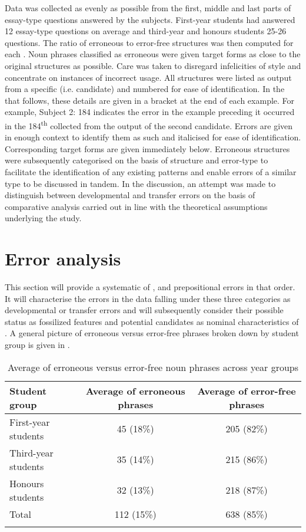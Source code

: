 \documentclass[output=paper]{langsci/langscibook}
\begin{document}
Data was collected as evenly as possible from the first, middle and
last parts of essay-type questions answered by the
subjects. First-year students had answered 12 essay-type questions on
average and third-year and honours students 25-26 questions. The ratio
of erroneous to error-free structures was then computed for each
. Noun phrases classified as erroneous were given target forms
as close to the original structures as possible. Care was taken to
disregard infelicities of style and concentrate on instances of
incorrect usage. All structures were listed as output from a specific
 (i.e. candidate) and numbered for ease of identification. In
the  that follows, these details are given in a bracket
at the end of each example. For example, Subject 2: 184
indicates the error in the example preceding it occurred in the
184\textsuperscript{th}   collected from the output of the
second candidate. Errors are given in enough context to identify them
as such and italicised for ease of identification. Corresponding
target forms are given immediately below. Erroneous structures were
subsequently categorised on the basis of structure and error-type to
facilitate the identification of any existing patterns and enable
errors of a similar type to be discussed in tandem. In the discussion,
an attempt was made to distinguish between developmental and transfer
errors on the basis of comparative analysis carried out in line with
the theoretical assumptions underlying the study.


\section{Error analysis}
\label{sec:key:4}
This section will provide a systematic  of ,
 and prepositional errors in that order. It will
characterise the errors in the data falling under these three
categories as developmental or transfer errors and will subsequently
consider their possible status as fossilized features and potential
candidates as nominal characteristics of . A general
picture of erroneous versus error-free  phrases broken down by
student group is given in .

\begin{table}
\begin{tabularx}{\textwidth}{lSS}
\lsptoprule
\textbf{Student group} & \textbf{Average of erroneous  phrases} & \textbf{Average of error-free  phrases}\\
\midrule 
First-year students & 45 (18\%) & 205 (82\%)\\
Third-year students & 35 (14\%) & 215 (86\%)\\
Honours students & 32 (13\%) & 218 (87\%)\\
Total & 112 (15\%) & 638 (85\%)\\
\lspbottomrule
\end{tabularx}
\caption{Average of erroneous versus error-free noun phrases across year groups}
\label{tab:key:1}
\end{table}
\end{document}

